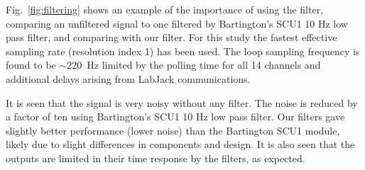 
Fig.~\ref{fig:filtering} shows an example of the importance of using
the filter, comparing an unfiltered signal to one filtered by
Bartington's SCU1 10 Hz low pass filter, and comparing with our
filter.  For this study the fastest effective sampling rate
(resolution index 1) has been used.  The loop sampling frequency is
found to be $\sim 220$~Hz limited by the polling time for all 14
channels and additional delays arising from LabJack communications.

It is seen that the signal is very noisy without any filter. The noise
is reduced by a factor of ten using Bartington's SCU1 10 Hz low pass
filter.  Our filters gave slightly better performance (lower noise)
than the Bartington SCU1 module, likely due to slight differences in
components and design.  It is also seen that the outputs are limited
in their time response by the filters, as expected.


